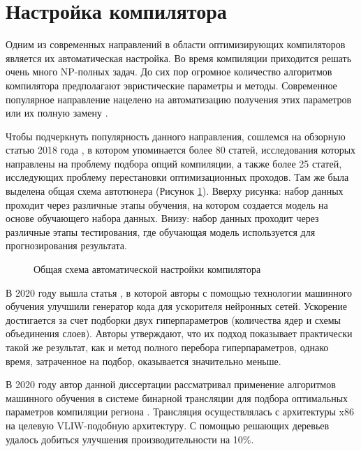  
\section{Настройка компилятора} \label{pr:tuning}

Одним из современных направлений в области оптимизирующих компиляторов является их автоматическая настройка. Во время компиляции приходится решать очень много NP-полных задач. До сих пор огромное количество алгоритмов компилятора предполагают эвристические параметры и методы. Современное популярное направление нацелено на автоматизацию получения этих параметров или их полную замену \cite{leather2020machine}.

Чтобы подчеркнуть популярность данного направления, сошлемся на обзорную статью 2018 года \cite{ashouri2018survey}, в котором упоминается более 80 статей, исследования которых направлены на проблему подбора опций компиляции, а также более 25 статей, исследующих проблему перестановки оптимизационных проходов. Там же была выделена общая схема автотюнера (Рисунок \ref{partReview:ml_for_comp1}). Вверху рисунка: набор данных проходит через различные этапы обучения, на котором создается модель на основе обучающего набора данных. Внизу: набор данных проходит через различные этапы тестирования, где обучающая модель используется для прогнозирования результата.  

 \begin{figure}[htbp]
	\centering
	
	\caption{Общая схема автоматической настройки компилятора \cite{ashouri2018survey}}
	\label{partReview:ml_for_comp1}
\end{figure}

В 2020 году вышла статья \cite{liu2020dlfusion}, в которой авторы с помощью технологии машинного обучения улучшили генератор кода для ускорителя нейронных сетей. Ускорение достигается за счет подборки двух гиперпараметров (количества ядер и схемы объединения слоев). Авторы утверждают, что их подход показывает практически такой же результат, как и метод полного перебора гиперпараметров, однако время, затраченное на подбор, оказывается значительно меньше. 


В 2020 году автор данной диссертации рассматривал применение алгоритмов машинного обучения в системе бинарной трансляции для подбора оптимальных параметров компиляции региона  \cite{confmiptml1}. Трансляция осуществлялась с архитектуры x86 на целевую VLIW-подобную архитектуру. С помощью решающих деревьев удалось добиться улучшения производительности на 10\%.




